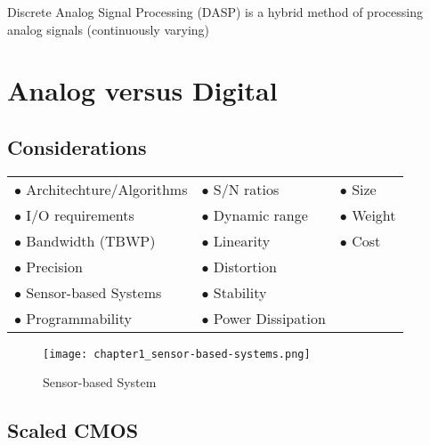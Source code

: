 \documentclass[11pt,fleqn]{book} %
\begin{document}
Discrete Analog Signal Processing (DASP) is a hybrid method of processing analog signals (continuously varying)


\section{Analog versus Digital}

\subsection{Considerations}

\begin{table}[h]
  \centering
  \begin{tabulary}{1\textwidth}{lll}
    $\bullet$ Architechture/Algorithms & $\bullet$ S/N ratios & $\bullet$ Size \\
    $\bullet$ I/O requirements & $\bullet$ Dynamic range & $\bullet$ Weight \\
    $\bullet$ Bandwidth (TBWP) & $\bullet$ Linearity & $\bullet$ Cost \\
    $\bullet$ Precision & $\bullet$ Distortion &  \\
    $\bullet$ Sensor-based Systems & $\bullet$ Stability & \\
    $\bullet$ Programmability & $\bullet$ Power Dissipation &  \\
  \end{tabulary}
\end{table}

\begin{figure}[h]
  \centering\texttt{[image: chapter1\_sensor-based-systems.png]}
  \caption{Sensor-based System}
\end{figure}


\subsection{Scaled CMOS}
\end{document}
